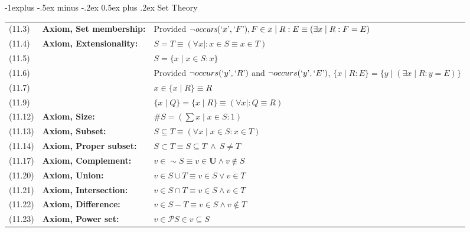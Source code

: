 \documentclass[letterpaper, 8pt]{extarticle}
\makeatletter
\renewcommand{\subsection}{\@startsection{subsection}{2}{0mm}%
                                {-1explus -.5ex minus -.2ex}%
                                {0.5ex plus .2ex}%
                                {\normalfont\small\bfseries}}
\makeatother
\begin{document}
\begin{multicols*}{3}
    \subsection{Set Theory}
    \begin{tabulary}{\linewidth}{@{}lLL@{}}
        (11.3) & \textbf{Axiom, Set membership:} & Provided $\neg \textit{occurs}(`x\textrm', `F\textrm'), F \in {x \mid R : E} \equiv (\exists x \mid R : F = E)$ \\
        (11.4) & \textbf{Axiom, Extensionality:} & $S = T \equiv (\forall x \mid : x \in S \equiv x \in T)$ \\
        (11.5) & & $S = \{ x \mid x \in S : x \}$ \\
        (11.6) & & Provided $\neg occurs(`y\textrm', `R\textrm')$ and $\neg occurs(`y\textrm', `E\textrm')$, $\{ x \mid R : E \} = \{y \mid (\exists x \mid R : y = E)\}$ \\
        (11.7) & & $x \in \{x \mid R \} \equiv R$ \\
        (11.9) & & $\{x \mid Q \} = \{x \mid R \} \equiv (\forall x \mid : Q \equiv R)$ \\
        (11.12) & \textbf{Axiom, Size:} & $\#S = (\sum x \mid x \in S : 1)$ \\
        (11.13) & \textbf{Axiom, Subset:} & $S \subseteq T \equiv (\forall x \mid x \in S : x \in T)$ \\
        (11.14) & \textbf{Axiom, Proper subset:} & $S \subset T \equiv S \subseteq T \ \land \ S \neq T$ \\
        (11.17) & \textbf{Axiom, Complement:} & $v \in \sim S \equiv v \in \mathbf{U} \land v \not\in S$ \\
        (11.20) & \textbf{Axiom, Union:} & $v \in S \cup T \equiv v \in S \lor v \in T$ \\
        (11.21) & \textbf{Axiom, Intersection:} & $v \in S \cap T \equiv v \in S \land v \in T$ \\
        (11.22) & \textbf{Axiom, Difference:} & $v \in S - T \equiv v \in S \land v \not\in T$ \\
        (11.23) & \textbf{Axiom, Power set:} & $v \in \mathcal{P} S \in v \subseteq S$ \\
    \end{tabulary}

\end{multicols*}
\end{document}

